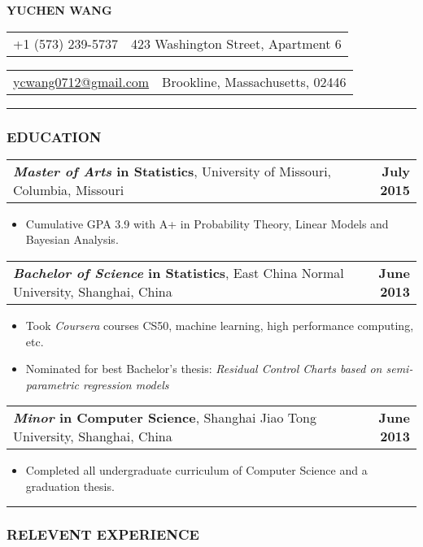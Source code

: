 \documentclass[11pt]{article}
\makeatletter
\newcommand{\headerrow}[2]
{\begin{tabular*}{\linewidth}{l@{\extracolsep{\fill}}r}
	#1 & #2 \\
\end{tabular*}
}
\makeatother
\begin{document}
\begin{center}
	\huge\textbf{YUCHEN WANG}
\end{center}

\noindent\headerrow{+1 (573) 239-5737}{423 Washington Street, Apartment 6}
\headerrow{\href{mailto:ycwang0712@gmail.com}{ycwang0712@gmail.com}}{Brookline, Massachusetts, 02446}

\vspace{-.8em}
\hrule

\subsubsection*{\centering EDUCATION}
\vspace{-.3em}

\headerrow
	{\textbf{\emph{Master of Arts} in Statistics}, University of Missouri, Columbia, Missouri}
	{\textbf{July 2015}}
	\begin{itemize}
		\item Cumulative GPA 3.9 with A+ in Probability Theory, Linear Models and Bayesian Analysis.
	\end{itemize}

\noindent\headerrow
	{\textbf{\emph{Bachelor of Science} in Statistics}, East China Normal University, Shanghai, China}
	{\textbf{June 2013}}
	\begin{itemize}
		\item Took \emph{Coursera} courses CS50, machine learning, high performance computing, etc.
		\item Nominated for best Bachelor's thesis: \textit{Residual Control Charts based on semi-parametric regression models}
	\end{itemize}

\noindent\headerrow
	{\textbf{\emph{Minor} in Computer Science}, Shanghai Jiao Tong University, Shanghai, China}
	{\textbf{June 2013}}
	\begin{itemize}
		\item Completed all undergraduate curriculum of Computer Science and a graduation thesis.
	\end{itemize}


\vspace{0.2em}
\hrule


\subsubsection*{\centering RELEVENT EXPERIENCE}
\vspace{-.3em}
\end{document}
